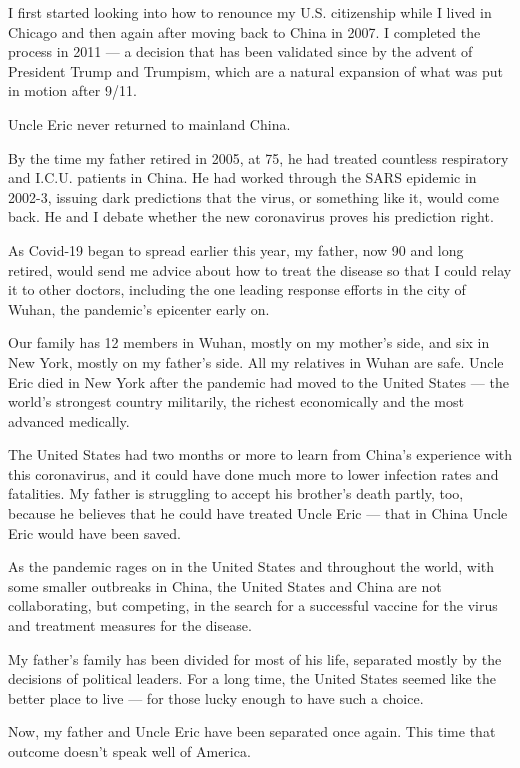 I first started looking into how to renounce my U.S. citizenship while I
lived in Chicago and then again after moving back to China in 2007. I
completed the process in 2011 --- a decision that has been validated
since by the advent of President Trump and Trumpism, which are a natural
expansion of what was put in motion after 9/11.

Uncle Eric never returned to mainland China.

By the time my father retired in 2005, at 75, he had treated countless
respiratory and I.C.U. patients in China. He had worked through the SARS
epidemic in 2002-3, issuing dark predictions that the virus, or
something like it, would come back. He and I debate whether the new
coronavirus proves his prediction right.

As Covid-19 began to spread earlier this year, my father, now 90 and
long retired, would send me advice about how to treat the disease so
that I could relay it to other doctors, including the one leading
response efforts in the city of Wuhan, the pandemic's epicenter early
on.

Our family has 12 members in Wuhan, mostly on my mother's side, and six
in New York, mostly on my father's side. All my relatives in Wuhan are
safe. Uncle Eric died in New York after the pandemic had moved to the
United States --- the world's strongest country militarily, the richest
economically and the most advanced medically.

The United States had two months or more to learn from China's
experience with this coronavirus, and it could have done much more to
lower infection rates and fatalities. My father is struggling to accept
his brother's death partly, too, because he believes that he could have
treated Uncle Eric --- that in China Uncle Eric would have been saved.

As the pandemic rages on in the United States and throughout the world,
with some smaller outbreaks in China, the United States and China are
not collaborating, but competing, in the search for a successful vaccine
for the virus and treatment measures for the disease.

My father's family has been divided for most of his life, separated
mostly by the decisions of political leaders. For a long time, the
United States seemed like the better place to live --- for those lucky
enough to have such a choice.

Now, my father and Uncle Eric have been separated once again. This time
that outcome doesn't speak well of America.

